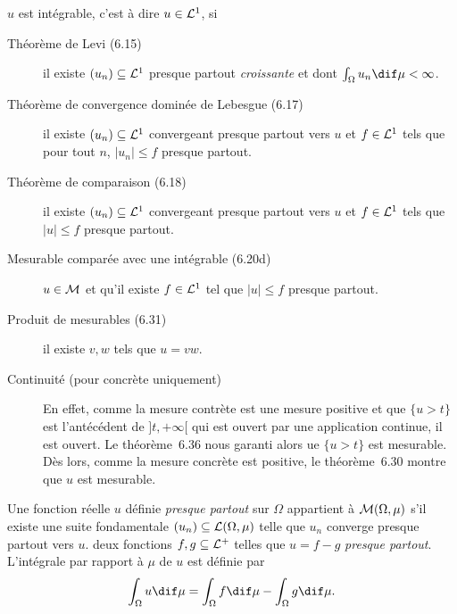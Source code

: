 \begin{myprop}
  $u$ est intégrable, c'est à dire $u \in \mathcal{L}^1$, si
  \begin{description}
    \item[Théorème de Levi (6.15)]
      il existe $(u_n) \subseteq \mathcal{L}^1$ presque partout \emph{croissante} et dont $\int_\Omega u_n \dif \mu < \infty$.
    \item[Théorème de convergence dominée de Lebesgue (6.17)]
      il existe $(u_n) \subseteq \mathcal{L}^1$ convergeant presque partout vers $u$
      et $f \in \mathcal{L}^1$ tels que pour tout $n$, $|u_n| \leq f$ presque partout.
    \item[Théorème de comparaison (6.18)]
      il existe $(u_n) \subseteq \mathcal{L}^1$ convergeant presque partout vers $u$
      et $f \in \mathcal{L}^1$ tels que $|u| \leq f$ presque partout.
    \item[Mesurable comparée avec une intégrable (6.20d)] $u \in \mathcal{M}$ et qu'il existe $f \in \mathcal{L}^1$ tel que $|u| \leq f$ presque partout.
    \item[Produit de mesurables (6.31)] il existe $v,w$ tels que $u = vw$.
    \item[Continuité (pour concrète uniquement)] En effet, comme la mesure contrète est une mesure positive
      et que $\{u > t\}$ est l'antécédent de $]t,+\infty[$ qui est ouvert par une application continue, il est ouvert.
      Le théorème~6.36 nous garanti alors ue $\{u > t\}$ est mesurable.
      Dès lors, comme la mesure concrète est positive, le théorème~6.30 montre que $u$ est mesurable.
  \end{description}
\end{myprop}


\begin{mydef}
  Une fonction réelle $u$ définie \emph{presque partout} sur $\Omega$
  appartient à $\mathcal{M}(\Omega,\mu)$ s'il existe une suite fondamentale $(u_n) \subseteq \mathcal{L}(\Omega,\mu)$ telle
  que $u_n$ converge presque partout vers $u$.
  deux fonctions $f,g \subseteq \mathcal{L}^+$ telles que $u = f - g$ \emph{presque partout}.
  L'intégrale par rapport à $\mu$ de $u$ est définie par
  \[ \int_\Omega u \dif \mu = \int_\Omega f \dif \mu - \int_\Omega g \dif \mu. \]
\end{mydef}

